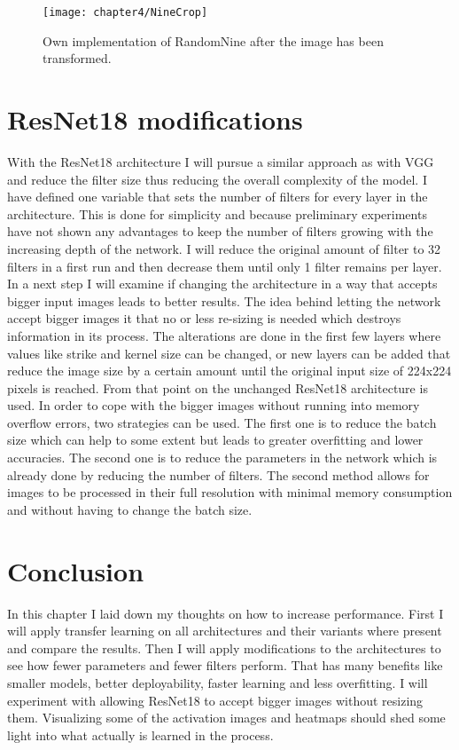\begin{figure}[H]
  \centering
  \caption{Own implementation of RandomNine after the image has been transformed.}
  \texttt{[image: chapter4/NineCrop]}
  \label{fig:TenCrop}
\end{figure}


\section{ResNet18 modifications}

With the ResNet18 architecture I will pursue a similar approach as with VGG and reduce the filter size thus reducing the overall complexity of the model. I have defined one variable that sets  the number of filters for every layer in  the architecture. This is done for  simplicity and because preliminary  experiments  have not shown any advantages to keep  the number of filters growing with the increasing depth of the network. I will reduce the  original amount of filter to 32 filters in a first run and then decrease them until only 1 filter remains per layer. \\

In a next step I will examine if changing the architecture in a way that accepts bigger input images leads to better results. The idea behind letting the network  accept bigger images it that  no or less re-sizing is  needed which destroys information in its process. The alterations are done in the first few layers where values like strike and kernel size can be changed, or new layers can be added that reduce the image size by a certain amount until the original input size of 224x224 pixels is reached. From that point on the unchanged ResNet18 architecture is used. In order to cope with the bigger images without running into memory overflow errors, two strategies can be used.  The  first one is  to reduce the batch size which can  help to some extent but leads to greater overfitting and lower accuracies. The second one is to reduce the  parameters in  the network which is already done by reducing the number of filters. The second method allows for images to be processed in their full resolution with minimal memory consumption and without having to change the batch size.

\section{Conclusion}

In this chapter I laid down my thoughts on how to increase performance. First I will apply transfer learning on all architectures and their variants where present and compare the results. Then I will apply modifications to the architectures to see how fewer parameters and fewer filters perform. That has many benefits like smaller models, better deployability, faster learning and less overfitting. I will experiment with allowing ResNet18 to accept  bigger images without resizing them. Visualizing some  of the activation images and heatmaps should shed some light into what  actually is learned in the process.